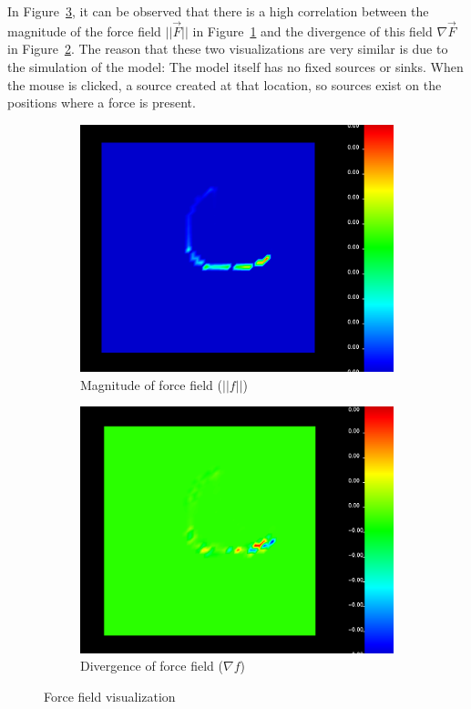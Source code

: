 In Figure~\ref{fig:force_field}, it can be observed that there is a high correlation between the magnitude of the force field $||\vec{F}||$ in Figure~\ref{fig:force_mag} and the divergence of this field $\nabla \vec{F}$ in Figure~\ref{fig:div_force}.
The reason that these two visualizations are very similar is due to the simulation of the model: The model itself has no fixed sources or sinks. 
When the mouse is clicked, a source created at that location, so sources exist on the positions where a force is present.
\begin{figure}[htb]
    \centering
    \begin{subfigure}[htb]{.49\textwidth}
        \includegraphics[width =\textwidth]{content/pictures/force_magnitude.png}
        \caption{Magnitude of force field ($||f||$)}
        \label{fig:force_mag}
    \end{subfigure}
    \begin{subfigure}[htb]{.49\textwidth}
        \includegraphics[width =\textwidth]{content/pictures/div_force.png}
        \caption{Divergence of force field ($\nabla f$) }
        \label{fig:div_force}
    \end{subfigure}
    \caption{Force field visualization}
    \label{fig:force_field}
\end{figure}


\clearpage